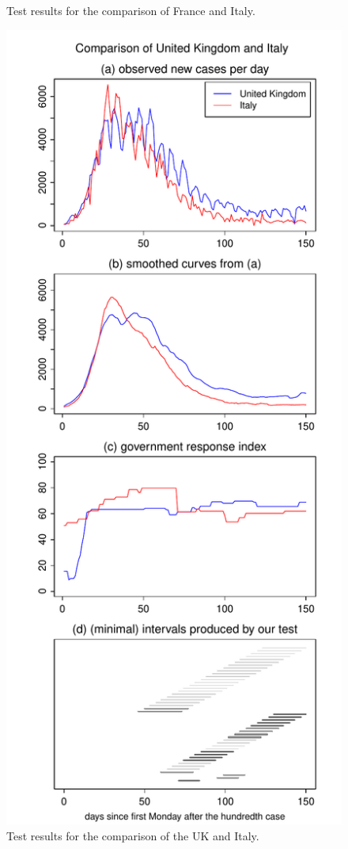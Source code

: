 \documentclass[a4paper,12pt]{article}
\numberwithin{equation}{section}
\begin{document}
\begin{figure}[h!]
\begin{minipage}[t]{0.49\textwidth}
\caption{Test results for the comparison of France and Italy.}
\end{minipage}
\hspace{0.25cm}
\begin{minipage}[t]{0.49\textwidth}
\includegraphics[width=\textwidth]{plots/GBR_vs_ITA}
\caption{Test results for the comparison of the UK and Italy.}
\end{minipage}
\end{figure}
\end{document}
